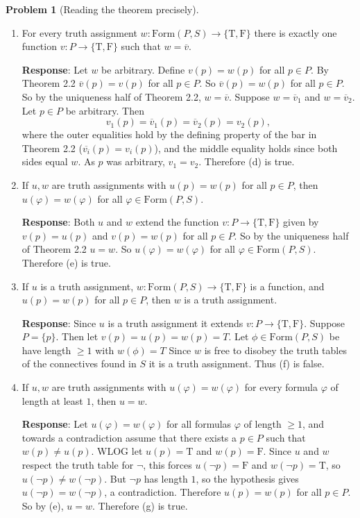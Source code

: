 \documentclass[11pt]{article}
\newcommand{\Form}{\mathrm{Form}}
\newcommand{\T}{\mathrm{T}}
\newcommand{\F}{\mathrm{F}}
\newcommand{\TF}{\{\T,\F\}}
\newcommand{\ext}[1]{\overline{#1}}
\theoremstyle{definition}
\newtheorem{problem}{Problem}
\begin{document}
\begin{problem}[Reading the theorem precisely]
\begin{enumerate}

\item[(d)] For every truth assignment $w\colon\Form(P,S)\to\TF$ there is exactly one function $v\colon P\to\TF$ such that $w=\ext{v}$.

\textbf{Response}:
Let $w$ be arbitrary.
Define $v(p) = w(p)$ for all $p \in P$.
By Theorem 2.2 $\ext{v}(p) = v(p)$ for all $p \in P$.
So $\ext{v}(p) = w(p)$ for all $p \in P$.
So by the uniqueness half of Theorem 2.2, $w=\ext{v}$.
Suppose $w = \ext{v}_1$ and $w = \ext{v}_2$.
Let $p \in P$ be arbitrary. Then
\[
v_1(p) = \ext{v}_1(p) = \ext{v}_2(p) = v_2(p),
\]
where the outer equalities hold by the defining property of the bar in Theorem 2.2 ($\ext{v_i}(p) = v_i(p)$), and the middle equality holds since both sides equal $w$. As $p$ was arbitrary, $v_1 = v_2$.
Therefore (d) is true.



\item[(e)] If $u,w$ are truth assignments with $u(p)=w(p)$ for all $p\in P$, then $u(\varphi)=w(\varphi)$ for all $\varphi\in\Form(P,S)$.

\textbf{Response}:
Both $u$ and $w$ extend the function $v \colon P\to\TF$ given by $v(p)=u(p)$ and $v(p)=w(p)$ for all $p \in P$.
So by the uniqueness half of Theorem 2.2 $u = w$.
So $u(\varphi)=w(\varphi)$ for all $\varphi\in\Form(P,S)$.
Therefore (e) is true.


\item[(f)] If $u$ is a truth assignment, $w\colon\Form(P,S)\to\TF$ is a function, and $u(p)=w(p)$ for all $p\in P$, then $w$ is a truth assignment.

\textbf{Response}:
Since $u$ is a truth assignment it extends $v \colon P\to\TF$.
Suppose $P = \{ p \}$.
Then let $v(p) = u(p) = w(p) = T$.
Let $\phi \in \Form(P, S)$ be have length $\geq 1$ with $w(\phi) = T$
Since $w$ is free to disobey the truth tables of the connectives found in $S$ it is a truth assignment.
Thus (f) is false.


\item[(g)] If $u,w$ are truth assignments with $u(\varphi)=w(\varphi)$ for every formula $\varphi$ of length at least $1$, then $u=w$.

\textbf{Response}:
Let $u(\varphi)=w(\varphi)$ for all formulas $\varphi$ of length $\geq 1$, and towards a contradiction assume that there exists a $p \in P$ such that $w(p) \neq u(p)$.
WLOG let $u(p) = \T$ and $w(p) = \F$.
Since $u$ and $w$ respect the truth table for $\neg$, this forces $u(\neg p) = \F$ and $w(\neg p) = \T$, so $u(\neg p) \neq w(\neg p)$.
But $\neg p$ has length $1$, so the hypothesis gives $u(\neg p) = w(\neg p)$, a contradiction.
Therefore $u(p) = w(p)$ for all $p \in P$.
So by (e), $u = w$.
Therefore (g) is true.

\end{enumerate}
\end{problem}
\end{document}
